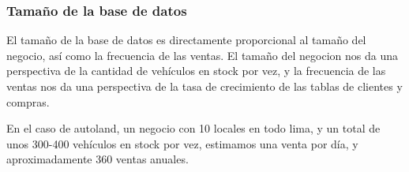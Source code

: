 \documentclass[12pt]{article}
\begin{document}
\subsubsection{Tama\~no de la base de datos}

El tamaño de la base de datos es directamente proporcional al tamaño del negocio, así como la frecuencia de las ventas. El tamaño del negocion nos da una perspectiva de la cantidad de vehículos en stock por vez, y la frecuencia de las ventas nos da una perspectiva de la tasa de crecimiento de las tablas de clientes y compras.

En el caso de autoland, un negocio con 10 locales en todo lima, y un total de unos 300-400 vehículos en stock por vez, estimamos una venta por día, y aproximadamente 360 ventas anuales.

\newpage
\end{document}
